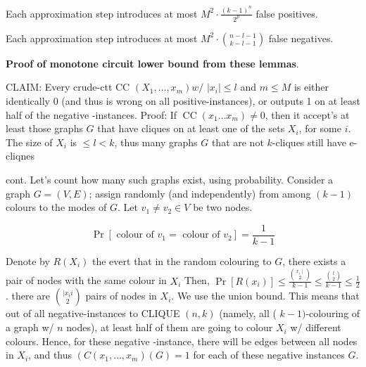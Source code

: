 \begin{lemma}\label{lem:new-false-positives}
Each approximation step introduces at most $M^2 \cdot \frac{(k-1)^n}{2^p}$ false positives.
\end{lemma}

\begin{lemma}\label{lem:new-false-negatives}
Each approximation step introduces at most $M^2 \cdot\binom{n-l-1}{k-l-1}$ false negatives.
\end{lemma}


\bigskip









\textbf{Proof of monotone circuit lower bound from these lemmas}. 

CLAIM: Every crude-ctt CC $\left(X_1, \ldots, x_m\right) w /$ $\left|x_i\right| \leq l$ and $m \leqslant M$ is either identically 0 (and thus is wrong on all positive-instances), or outputs 1 on at least half of the negative -instances.
Proof: If $\operatorname{CC}\left(x_1 \ldots x_m\right) \neq 0$, then it accept's at least those graphs $G$ that have cliques on at least one of the sets $X_i$, for some $i$. The size of $X_i$ is $\leqslant l<k$, thus many graphs $G$ that are not $k$-cliques still have e-cliqnes



cont.
Let's count how many such graphs exist, using probability. Consider a graph $G=(V, E)$; assign randomly (and independently) from among $(k-1)$ colours to the modes of $G$. Let $v_1 \neq v_2 \in V$ be two nodes.

$$
\operatorname{Pr}\left[\text { colour of } v_1=\text { colour of } v_2\right]=\frac{1}{k-1}
$$


Denote by $R\left(X_i\right)$ the evert that in the random colouring to $G$, there exists a pair of nodes with the same colour in $X_i$
Then, $\operatorname{Pr}\left[R\left(x_i\right)\right] \leqslant \frac{\binom{x_i \mid}{ 2}}{k-1} \leqslant \frac{\binom{l}{2}}{k-1} \leqslant \frac{1}{2}$.
there are $\binom{\mid x_i i}{2}$ pairs
of nodes in $X_i$. We use
the union bound.
This means that out of all negative-instances to CLIQUE $(n, k)$ (namely, all ( $k-1)$-colouring of a graph w/ $n$ nodes), at least half of them are going to colour $X_i$ w/ different colours. Hence, for these negative -instance, there will be edges between all nodes in $X_i$, and thus $\left(C\left(x_1, \ldots, x_m\right)(G)=1\right.$ for each of these negative instances $G$.




